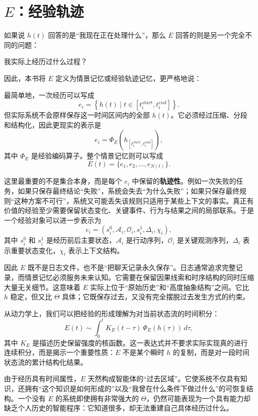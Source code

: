 \section{$E$：经验轨迹}

如果说 $h(t)$ 回答的是“我现在正在处理什么”，那么 $E$ 回答的则是另一个完全不同的问题：
\begin{statementbox}
我实际上经历过什么过程？
\end{statementbox}
因此，本书将 $E$ 定义为情景记忆或经验轨迹记忆，更严格地说：
\begin{statementbox}
\centering
{}
\end{statementbox}

最简单地，一次经历可以写成
\[
e_i
=
\left\{
h(t)
\mid
t\in[t_i^{start},t_i^{end}]
\right\}.
\]
但实际系统不会原样保存这一时间区间内的全部 $h(t)$。它必须经过压缩、分段和结构化，因此更现实的表示是
\[
e_i
=
\Phi_E
\left(
h_{[t_i^{start},t_i^{end}]}
\right),
\]
其中 $\Phi_E$ 是经验编码算子。整个情景记忆则可以写成
\[
E(t)
=
\{e_1,e_2,\ldots,e_{N(t)}\}.
\]

这里最重要的不是集合本身，而是每个 $e_i$ 中保留的\textbf{轨迹性}。例如一次失败的任务，如果只保存最终结论“失败”，系统会失去“为什么失败”；如果只保存最终规则“这种方案不可行”，系统又可能丢失该规则只适用于某些上下文的事实。真正有价值的经验至少需要保留状态变化、关键事件、行为与结果之间的局部联系。于是一个经验对象可以进一步表示为
\[
e_i
=
\left(
s_i^{0},
\mathcal{A}_i,
\mathcal{O}_i,
s_i^{1},
\Delta_i,
\chi_i
\right),
\]
其中 $s_i^{0}$ 和 $s_i^{1}$ 是经历前后主要状态，$\mathcal{A}_i$ 是行动序列，$\mathcal{O}_i$ 是关键观测序列，$\Delta_i$ 表示重要状态变化，$\chi_i$ 表示上下文结构。

因此 $E$ 既不是日志文件，也不是“把聊天记录永久保存”。日志通常追求完整记录，而情景记忆必须服务未来认知。它需要在保留因果线索和时序结构的同时压缩大量无关细节。这意味着 $E$ 实际上位于“原始历史”和“高度抽象结构”之间。它比 $h$ 稳定，但又比 $\Theta$ 具体；它既保存过去，又没有完全摆脱过去发生方式的约束。

从动力学上，我们可以把经验的形成理解为对当前状态流的时间积分：
\[
E(t)
\sim
\int_{0}^{t}
K_E(t-\tau)\,
\Phi_E(h(\tau))
\,d\tau,
\]
其中 $K_E$ 是描述历史保留强度的核函数。这一表达式并不要求实际实现真的进行连续积分，而是揭示一个重要性质：$E$ 不是某个瞬时 $h$ 的复制，而是对一段时间状态流的累计结构化结果。

由于经历具有时间属性，$E$ 天然构成智能体的“过去区域”。它使系统不仅具有知识，还拥有“这个知识是如何形成的”以及“我曾在什么条件下做过什么”的可恢复结构。一个没有 $E$ 的系统即使拥有非常强大的 $\Theta$，仍然可能表现为一个具有能力却缺乏个人历史的智能程序：它知道很多，却无法重建自己具体经历过什么。


